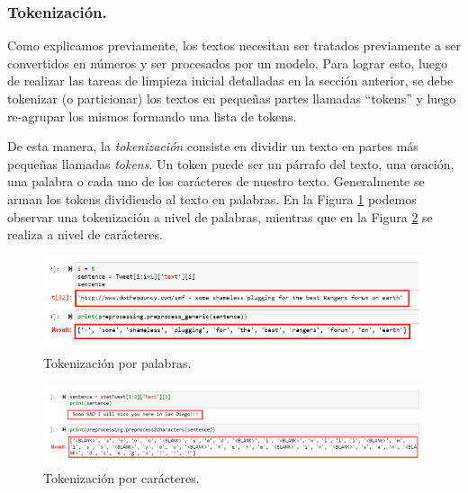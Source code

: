 \documentclass[12pt,a4paper]{article}
\begin{document}
\begin{sloppypar}
\begin{enumerate}
\end{enumerate}

\cleardoublepage

\subsubsection{Tokenización.}\label{tokenizacion}

Como explicamos previamente, los textos necesitan ser tratados previamente a ser convertidos en números y ser procesados por un modelo. Para lograr esto, luego de realizar las tareas de limpieza inicial detalladas en la sección anterior, se debe tokenizar (o particionar) los textos en pequeñas partes llamadas “tokens” y luego re-agrupar los mismos formando una lista de tokens. 

De esta manera, la \textit{tokenización} consiste en dividir un texto en partes más pequeñas llamadas \textit{tokens}. Un token puede ser un párrafo del texto, una oración, una palabra o cada uno de los carácteres de nuestro texto. Generalmente se arman los tokens dividiendo al texto en palabras. En la Figura \ref{fig:Imagen_NLP_2} podemos observar una tokenización a nivel de palabras, mientras que en la Figura \ref{fig:Imagen_NLP_3} se realiza a nivel de carácteres. 

\begin{figure}[H]    
 \centering
 \includegraphics[width=1\textwidth]{images/NLP/2.png}
 \caption{Tokenización por palabras\cite{NLP_2}.}
 \label{fig:Imagen_NLP_2}
\end{figure}

\begin{figure}[H]    
 \centering
 \includegraphics[width=1\textwidth]{images/NLP/3.png}
 \caption{Tokenización por carácteres\cite{NLP_2}.}
 \label{fig:Imagen_NLP_3}
\end{figure}


\end{sloppypar}
\end{document}
